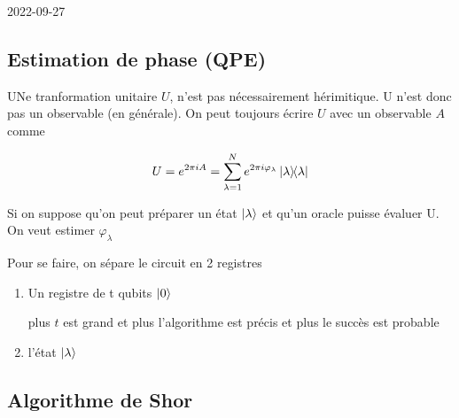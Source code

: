 

2022-09-27
\setcounter{section}{2}
\setcounter{subsection}{10}


\subsection{Estimation de phase (QPE)}

UNe tranformation unitaire $U$, n'est pas nécessairement hérimitique. U n'est donc pas un observable (en générale). On peut toujours écrire $U$ avec un observable $A$ comme

$$U = e^{2\pi i A} = \sum_{\lambda=1}^{N} e^{2\pi i \varphi_{\lambda}} \op{\lambda}$$ 

Si on suppose qu'on peut préparer un état $\ket{\lambda}$ et qu'un oracle puisse évaluer U. On veut estimer $\varphi_\lambda$ 

Pour se faire, on sépare le circuit en 2 registres

\begin{enumerate}
	\item Un registre de t qubits $\ket{0}$

		plus $t$ est grand et plus l'algorithme est précis et plus le succès est probable 
	\item l'état $\ket{\lambda}$ 
\end{enumerate}

\begin{center}
\end{center}
\subsection{Algorithme de Shor}

